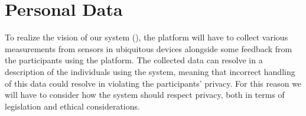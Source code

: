 
\section{Personal Data}
\label{sec:personal_data}

To realize the vision of our system (), the platform will have to collect various measurements from sensors in ubiquitous devices alongside some feedback from the participants using the platform. The collected data can resolve in a description of the individuals using the system, meaning that incorrect handling of this data could resolve in violating the participants' privacy. For this reason we will have to consider how the system should respect privacy, both in terms of legislation and ethical considerations.



